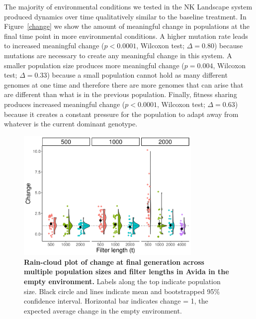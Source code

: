 \documentclass[letterpaper]{article}
\providecommand{\DIFaddtex}[1]{{\protect\color{blue}\uwave{#1}}} %
\providecommand{\DIFaddbegin}{} %
\providecommand{\DIFaddend}{} %
\providecommand{\DIFaddbeginFL}{} %
\providecommand{\DIFaddendFL}{} %
\providecommand{\DIFdelbeginFL}{} %
\providecommand{\DIFdelendFL}{} %
\providecommand{\DIFadd}[1]{\texorpdfstring{\DIFaddtex{#1}}{#1}} %
\begin{document}
The majority of environmental conditions we tested in the NK Landscape system produced dynamics over time qualitatively similar to the baseline treatment. In Figure~\ref{change} we show the amount of meaningful change in populations at the final time point in more environmental conditions. A higher mutation rate leads to increased meaningful change ($p<0.0001$, Wilcoxon test; \DIFaddbegin \DIFadd{Glass's }\DIFaddend $\Delta=0.80$) because mutations are necessary to create any meaningful change in this system. A smaller population size produces more meaningful change ($p=0.004$, Wilcoxon test; \DIFaddbegin \DIFadd{Glass's }\DIFaddend $\Delta=0.33$) because a small population cannot hold as many different genomes at one time and therefore there are more genomes that can arise that are different than what is in the previous population. Finally, fitness sharing produces increased meaningful change ($p<0.0001$, Wilcoxon test; \DIFaddbegin \DIFadd{Glass's }\DIFaddend $\Delta=0.63$) because it creates a constant pressure for the population to adapt away from whatever is the current dominant genotype.

\begin{figure}
    \centering
    \DIFdelbeginFL %
\DIFdelendFL \DIFaddbeginFL \includegraphics[width=3.5in]{figs/dolson.avida_filter_change_end.png}
    \DIFaddendFL \caption{\textbf{Rain-cloud plot of change at final generation across multiple population sizes and filter lengths in Avida in the empty environment.} Labels along the top indicate population size. Black circle and lines indicate mean and bootstrapped 95\% confidence interval. Horizontal bar indicates change = 1, the expected average change in the empty environment.    \DIFdelbeginFL %
\DIFdelendFL \label{fig:avida_filter_change}\DIFaddbeginFL }
\DIFaddendFL \end{figure}
\end{document}

